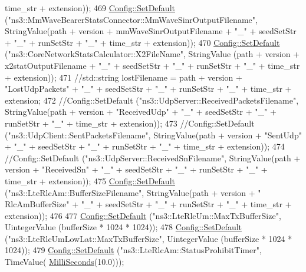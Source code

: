 \begin{DoxyCode}
{      time\_str + extension));
469   \hyperlink{group__config_ga2e7882df849d8ba4aaad31c934c40c06}{Config::SetDefault} (\textcolor{stringliteral}{"ns3::MmWaveBearerStatsConnector::MmWaveSinrOutputFilename"}, 
      StringValue(path + version + mmWaveSinrOutputFilename + \textcolor{stringliteral}{"\_"} + seedSetStr + \textcolor{stringliteral}{"\_"} + runSetStr + \textcolor{stringliteral}{"\_"} + time\_str + 
      extension));
470   \hyperlink{group__config_ga2e7882df849d8ba4aaad31c934c40c06}{Config::SetDefault} (\textcolor{stringliteral}{"ns3::CoreNetworkStatsCalculator::X2FileName"}, StringValue         
               (path + version + x2statOutputFilename    + \textcolor{stringliteral}{"\_"} + seedSetStr + \textcolor{stringliteral}{"\_"} + runSetStr + \textcolor{stringliteral}{"\_"} + time\_str + 
      extension));
471   \textcolor{comment}{//std::string lostFilename = path + version + "LostUdpPackets" +  "\_" + seedSetStr + "\_" + runSetStr +
       "\_" + time\_str + extension;}
472   \textcolor{comment}{//Config::SetDefault ("ns3::UdpServer::ReceivedPacketsFilename", StringValue(path + version +
       "ReceivedUdp" +  "\_" + seedSetStr + "\_" + runSetStr + "\_" + time\_str + extension));}
473   \textcolor{comment}{//Config::SetDefault ("ns3::UdpClient::SentPacketsFilename", StringValue(path + version + "SentUdp" + 
       "\_" + seedSetStr + "\_" + runSetStr + "\_" + time\_str + extension));}
474   \textcolor{comment}{//Config::SetDefault ("ns3::UdpServer::ReceivedSnFilename", StringValue(path + version + "ReceivedSn" + 
       "\_" + seedSetStr + "\_" + runSetStr + "\_" + time\_str + extension));}
475   \hyperlink{group__config_ga2e7882df849d8ba4aaad31c934c40c06}{Config::SetDefault} (\textcolor{stringliteral}{"ns3::LteRlcAm::BufferSizeFilename"}, StringValue(path + version + \textcolor{stringliteral}{"
      RlcAmBufferSize"} +  \textcolor{stringliteral}{"\_"} + seedSetStr + \textcolor{stringliteral}{"\_"} + runSetStr + \textcolor{stringliteral}{"\_"} + time\_str + extension));
476 
477   \hyperlink{group__config_ga2e7882df849d8ba4aaad31c934c40c06}{Config::SetDefault} (\textcolor{stringliteral}{"ns3::LteRlcUm::MaxTxBufferSize"}, UintegerValue (bufferSize * 1024 
      * 1024));
478   \hyperlink{group__config_ga2e7882df849d8ba4aaad31c934c40c06}{Config::SetDefault} (\textcolor{stringliteral}{"ns3::LteRlcUmLowLat::MaxTxBufferSize"}, UintegerValue (bufferSize *
       1024 * 1024));
479   \hyperlink{group__config_ga2e7882df849d8ba4aaad31c934c40c06}{Config::SetDefault} (\textcolor{stringliteral}{"ns3::LteRlcAm::StatusProhibitTimer"}, TimeValue(
      \hyperlink{group__timecivil_gaf26127cf4571146b83a92ee18679c7a9}{MilliSeconds}(10.0)));
}
\end{DoxyCode}
